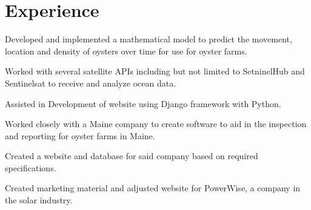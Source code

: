 \documentclass[letterpaper]{deedy-resume} %
\begin{document}
\begin{minipage}[t]{0.66\textwidth} %


\section{Experience}


\vspace{\topsep} %
\begin{tightitemize}
\item Developed and implemented a mathematical model to predict the movement, location and density of oysters over time for use for oyster farms.
\item Worked with several satellite APIs including but not limited to 
SetninelHub and Sentinelsat to receive and analyze ocean data.
\item Assisted in Development of website using Django framework with Python.
\end{tightitemize}

\sectionspace %



\vspace{\topsep} %
\begin{tightitemize}
\item Worked closely with a Maine company to create software to aid in the inspection and reporting for oyster farms in Maine.
\item Created a website and database for said company based on required specifications.
\item Created marketing material and adjusted website for PowerWise, a company in the solar industry.
\end{tightitemize}

\sectionspace %



\end{minipage}
\end{document}
